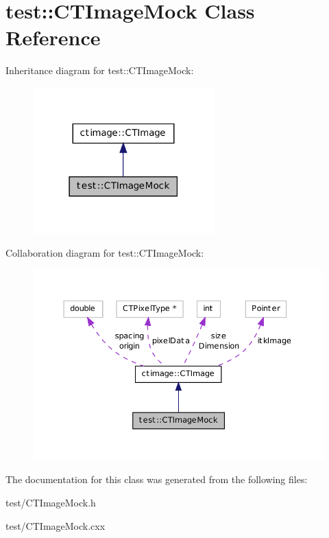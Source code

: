 \hypertarget{classtest_1_1_c_t_image_mock}{
\section{test::CTImageMock Class Reference}
\label{classtest_1_1_c_t_image_mock}
}


Inheritance diagram for test::CTImageMock:\nopagebreak
\begin{figure}[H]
\begin{center}
\leavevmode
\includegraphics[width=198pt]{classtest_1_1_c_t_image_mock__inherit__graph}
\end{center}
\end{figure}


Collaboration diagram for test::CTImageMock:\nopagebreak
\begin{figure}[H]
\begin{center}
\leavevmode
\includegraphics[width=375pt]{classtest_1_1_c_t_image_mock__coll__graph}
\end{center}
\end{figure}


The documentation for this class was generated from the following files:\begin{DoxyCompactItemize}
\item 
test/CTImageMock.h\item 
test/CTImageMock.cxx\end{DoxyCompactItemize}
